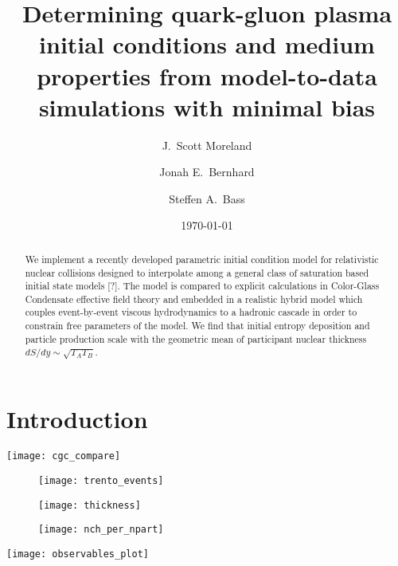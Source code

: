 \documentclass[aps,prc,reprint,amsmath]{revtex4-1}
\begin{document}
\title{Determining quark-gluon plasma initial conditions and medium \\ properties from model-to-data simulations with minimal bias}

\author{J.\ Scott Moreland}
\author{Jonah E.\ Bernhard}
\author{Steffen A.\ Bass}

\date{\today}


\begin{abstract}
  We implement a recently developed parametric initial condition model for relativistic nuclear collisions designed to interpolate among a general class of saturation based initial state models [?]. The model is compared to explicit calculations in Color-Glass Condensate effective field theory and embedded in a realistic hybrid model which couples event-by-event viscous hydrodynamics to a hadronic cascade in order to constrain free parameters of the model. We find that initial entropy deposition and particle production scale with the geometric mean of participant nuclear thickness $dS/dy \sim \sqrt{T_A T_B}$. 
\end{abstract}


\maketitle


\section{Introduction}

\begin{figure*}
    \texttt{[image: cgc\_compare]}
\end{figure*}

\begin{figure}
    \texttt{[image: trento\_events]}
\end{figure}

\begin{figure}[b]
    \texttt{[image: thickness]}
\end{figure}

\begin{figure}
    \texttt{[image: nch\_per\_npart]}
\end{figure}

\begin{figure*}
    \texttt{[image: observables\_plot]}
\end{figure*}
\end{document}
